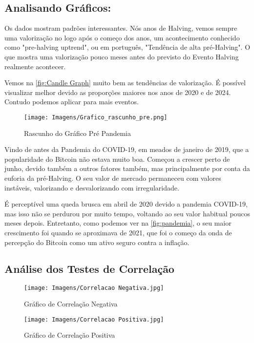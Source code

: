 \subsection{\textbf{Analisando Gráficos:}}

Os dados mostram padrões interessantes. Nós anos de Halving, vemos sempre uma valorização no logo após o começo dos anos, um acontecimento conhecido como "pre-halving uptrend", ou em português, "Tendência de alta pré-Halving". O que mostra uma valorização pouco meses antes do previsto do Evento Halving realmente acontecer. 

Vemos na \cref{fig:Candle Graph} muito bem as tendências de valorização. É possível visualizar melhor devido as proporções  maiores nos anos de 2020 e de 2024. Contudo podemos aplicar para mais eventos.

\begin{figure}[h]
    \centering
    \texttt{[image: Imagens/Grafico\_rascunho\_pre.png]}
    \caption{Rascunho do Gráfico Pré Pandemia}
    \label{fig:pre pandemia}
\end{figure}


Vindo de antes da Pandemia do COVID-19, em meados de janeiro de 2019, que a popularidade do Bitcoin não estava muito boa. Começou a crescer perto de junho, devido também a outros fatores também, mas principalmente por conta da euforia da pré-Halving. O seu valor de mercado permaneceu com valores instáveis, valorizando e desvalorizando com irregularidade. 

É perceptível uma queda brusca em abril de 2020 devido a pandemia COVID-19, mas isso não se perdurou por muito tempo, voltando ao seu valor habitual poucos meses depois. Entretanto, como podemos ver na \cref{fig:pandemia}, o seu maior crescimento foi quando se aproximava de 2021, que foi o começo da onda de percepção do Bitcoin como um ativo seguro contra a inflação.

\subsection{\textbf{Análise dos Testes de Correlação}}

\begin{figure}[ht]
  \centering
  \begin{minipage}{0.48\linewidth}
    \centering
    \texttt{[image: Imagens/Correlacao Negativa.jpg]}
    \caption{Gráfico de Correlação Negativa}
    \label{fig:correlacao-negativa}
  \end{minipage}\hfill
  \begin{minipage}{0.48\linewidth}
    \centering
    \texttt{[image: Imagens/Correlacao Positiva.jpg]}
    \caption{Gráfico de Correlação Positiva}
    \label{fig:correlacao-positiva}
  \end{minipage}
\end{figure}

